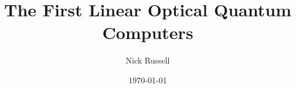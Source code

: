 \title{The First Linear Optical Quantum Computers}
\author{Nick Russell}
\date{\today}
\maketitle
\tableofcontents
